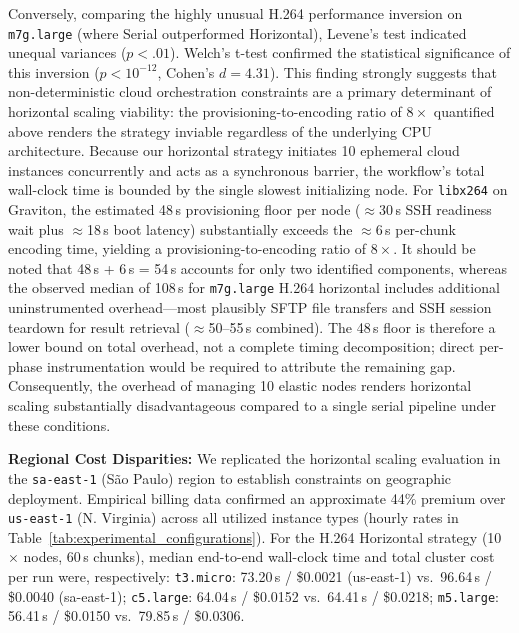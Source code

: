 \documentclass[conference]{IEEEtran}
\begin{document}
Conversely, comparing the highly unusual H.264 performance inversion on \texttt{m7g.large} (where Serial outperformed Horizontal), Levene's test indicated unequal variances ($p < .01$). Welch's t-test confirmed the statistical significance of this inversion ($p < 10^{-12}$, Cohen's $d = 4.31$). This finding strongly suggests that non-deterministic cloud orchestration constraints are a primary determinant of horizontal scaling viability: the provisioning-to-encoding ratio of $8\times$ quantified above renders the strategy inviable regardless of the underlying CPU architecture. Because our horizontal strategy initiates 10 ephemeral cloud instances concurrently and acts as a synchronous barrier, the workflow's total wall-clock time is bounded by the single slowest initializing node. For \texttt{libx264} on Graviton, the estimated 48\,s provisioning floor per node ($\approx$30\,s SSH readiness wait plus $\approx$18\,s boot latency) substantially exceeds the $\approx$6\,s per-chunk encoding time, yielding a provisioning-to-encoding ratio of $8\times$. It should be noted that 48\,s + 6\,s = 54\,s accounts for only two identified components, whereas the observed median of 108\,s for \texttt{m7g.large} H.264 horizontal includes additional uninstrumented overhead---most plausibly SFTP file transfers and SSH session teardown for result retrieval ($\approx$50--55\,s combined). The 48\,s floor is therefore a lower bound on total overhead, not a complete timing decomposition; direct per-phase instrumentation would be required to attribute the remaining gap. Consequently, the overhead of managing 10 elastic nodes renders horizontal scaling substantially disadvantageous compared to a single serial pipeline under these conditions.

\textbf{Regional Cost Disparities:} We replicated the horizontal scaling evaluation in the \texttt{sa-east-1} (São Paulo) region to establish constraints on geographic deployment. Empirical billing data confirmed an approximate 44\% premium over \texttt{us-east-1} (N. Virginia) across all utilized instance types (hourly rates in Table~\ref{tab:experimental_configurations}). For the H.264 Horizontal strategy (10$\times$ nodes, 60\,s chunks), median end-to-end wall-clock time and total cluster cost per run were, respectively: \texttt{t3.micro}: 73.20\,s / \$0.0021 (us-east-1) vs.\ 96.64\,s / \$0.0040 (sa-east-1); \texttt{c5.large}: 64.04\,s / \$0.0152 vs.\ 64.41\,s / \$0.0218; \texttt{m5.large}: 56.41\,s / \$0.0150 vs.\ 79.85\,s / \$0.0306.
\end{document}
